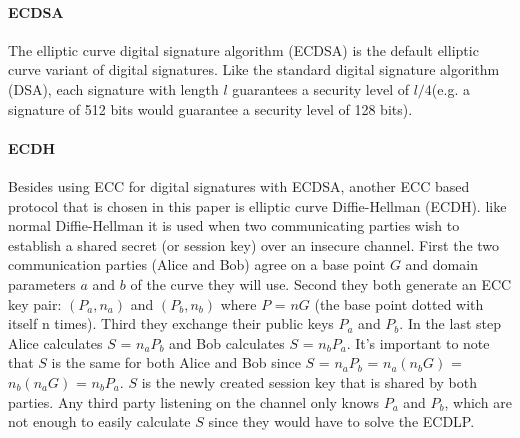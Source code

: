 \documentclass[master=cws,masteroption=vs,english]{kulemt}
\begin{document}
\paragraph{ECDSA} The elliptic curve digital signature algorithm (ECDSA) is the default elliptic curve variant of digital signatures. Like the standard digital signature algorithm (DSA), each signature with length $l$ guarantees a security level of $l/4$(e.g. a signature of 512 bits would guarantee a security level of 128 bits).

\paragraph{ECDH} Besides using ECC for digital signatures with ECDSA, another ECC based protocol that is chosen in this paper is elliptic curve Diffie-Hellman (ECDH). like normal Diffie-Hellman it is used when two communicating parties wish to establish a shared secret (or session key) over an insecure channel. First the two communication parties (Alice and Bob) agree on a base point $G$ and domain parameters $a$ and $b$ of the curve they will use. Second they both generate an ECC key pair: $(P_a,n_a)$ and $(P_b,n_b)$ where $P$ = $nG$ (the base point dotted with itself n times). Third they exchange their public keys $P_a$ and $P_b$. In the last step Alice calculates $S$ = $n_a P_b$ and Bob calculates $S$ = $n_b P_a$. It's important to note that $S$ is the same for both Alice and Bob since $S$ = $n_a P_b$ = $n_a ( n_b G )$ = $n_b ( n_a G )$ = $n_b P_a$. $S$ is the newly created session key that is shared by both parties. Any third party listening on the channel only knows $P_a$ and $P_b$, which are not enough to easily calculate $S$ since they would have to solve the ECDLP.
\end{document}
